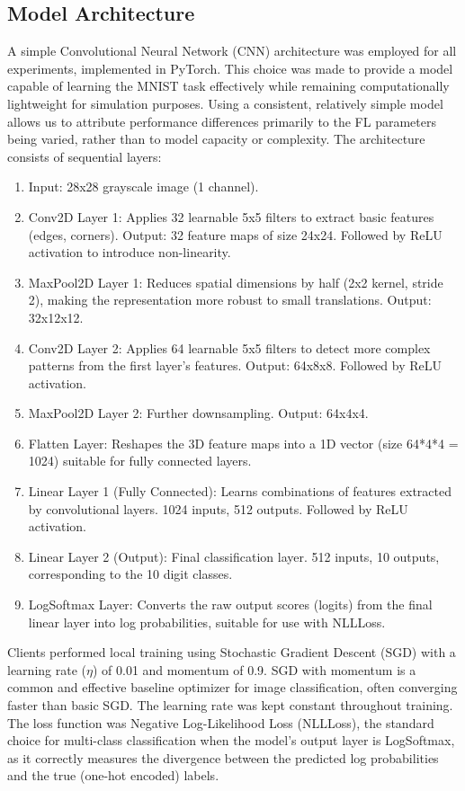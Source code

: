 \documentclass[conference]{IEEEtran}
\begin{document}
\subsection{Model Architecture}
A simple Convolutional Neural Network (CNN) architecture was employed for all experiments, implemented in PyTorch. This choice was made to provide a model capable of learning the MNIST task effectively while remaining computationally lightweight for simulation purposes. Using a consistent, relatively simple model allows us to attribute performance differences primarily to the FL parameters being varied, rather than to model capacity or complexity. The architecture consists of sequential layers:
\begin{enumerate}
    \item Input: 28x28 grayscale image (1 channel).
    \item Conv2D Layer 1: Applies 32 learnable 5x5 filters to extract basic features (edges, corners). Output: 32 feature maps of size 24x24. Followed by ReLU activation to introduce non-linearity.
    \item MaxPool2D Layer 1: Reduces spatial dimensions by half (2x2 kernel, stride 2), making the representation more robust to small translations. Output: 32x12x12.
    \item Conv2D Layer 2: Applies 64 learnable 5x5 filters to detect more complex patterns from the first layer's features. Output: 64x8x8. Followed by ReLU activation.
    \item MaxPool2D Layer 2: Further downsampling. Output: 64x4x4.
    \item Flatten Layer: Reshapes the 3D feature maps into a 1D vector (size 64*4*4 = 1024) suitable for fully connected layers.
    \item Linear Layer 1 (Fully Connected): Learns combinations of features extracted by convolutional layers. 1024 inputs, 512 outputs. Followed by ReLU activation.
    \item Linear Layer 2 (Output): Final classification layer. 512 inputs, 10 outputs, corresponding to the 10 digit classes.
    \item LogSoftmax Layer: Converts the raw output scores (logits) from the final linear layer into log probabilities, suitable for use with NLLLoss.
\end{enumerate}
Clients performed local training using Stochastic Gradient Descent (SGD) with a learning rate ($\eta$) of 0.01 and momentum of 0.9. SGD with momentum is a common and effective baseline optimizer for image classification, often converging faster than basic SGD. The learning rate was kept constant throughout training. The loss function was Negative Log-Likelihood Loss (NLLLoss), the standard choice for multi-class classification when the model's output layer is LogSoftmax, as it correctly measures the divergence between the predicted log probabilities and the true (one-hot encoded) labels.
\end{document}
